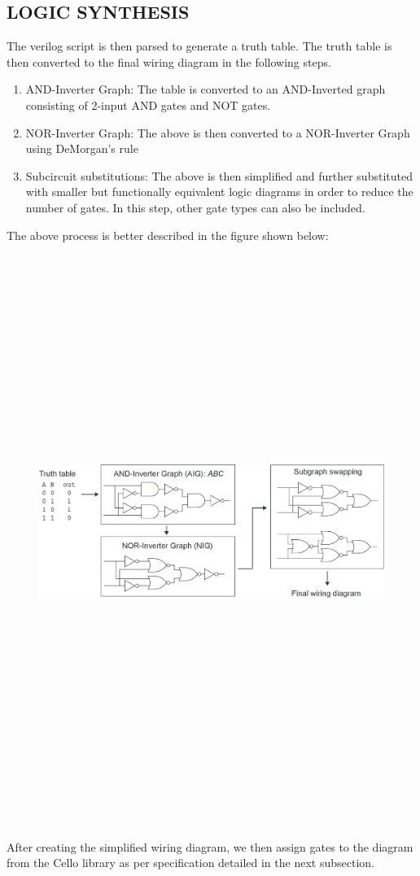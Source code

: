 \documentclass[11pt]{article}
\begin{document}
\subsection*{LOGIC SYNTHESIS}
The verilog script is then parsed to generate a truth table. The truth table is then converted to the final wiring diagram in the following steps.
\begin{enumerate}
\item AND-Inverter Graph:
The table is converted to an AND-Inverted graph consisting of 2-input AND gates and NOT gates.
\item NOR-Inverter Graph:
The above is then converted to a NOR-Inverter Graph using DeMorgan's rule
\item Subcircuit substitutions:
The above is then simplified and further substituted with smaller but functionally equivalent logic diagrams in order to reduce the number of gates. In this step, other gate types can also be included.
\end{enumerate}
The above process is better described in the figure shown below: 
\begin{figure}[ht!]
\centering
\includegraphics[width=18cm,height=18cm,keepaspectratio]{netsynth_xor_example.png}
\label{Case exmaple}
\end{figure}
\\[\baselineskip]    
After creating the simplified wiring diagram, we then assign gates to the diagram from the Cello library as per specification detailed in the next subsection.
\end{document}
